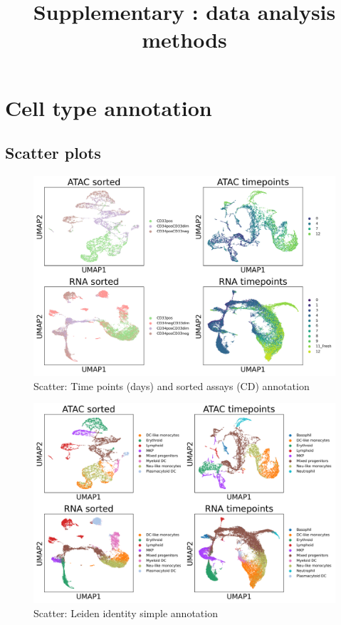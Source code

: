 \documentclass[a4paper]{article}
\begin{document}
\title{Supplementary : data analysis methods}
\maketitle

\tableofcontents

\section{Cell type annotation}

\subsection{Scatter plots}

\begin{figure}[!htb]
  \centering
  \includegraphics[width=\textwidth]{../figures/hematopoiesis/label.png}
  \caption{Scatter: Time points (days) and sorted assays (CD) annotation}
\end{figure}

\begin{figure}[!htb]
  \centering
  \includegraphics[width=\textwidth]{../figures/hematopoiesis/leiden_identity_simple2.png}
  \caption{Scatter: Leiden identity simple annotation}
\end{figure}
\end{document}
